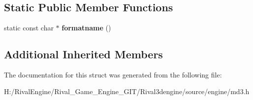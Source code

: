 \subsection*{Static Public Member Functions}
\begin{DoxyCompactItemize}
\item 
\mbox{\label{structmd3_a80b9257f903ddea6448d6ef2470c4413}} 
static const char $\ast$ {\bfseries formatname} ()
\end{DoxyCompactItemize}
\subsection*{Additional Inherited Members}


The documentation for this struct was generated from the following file\+:\begin{DoxyCompactItemize}
\item 
H\+:/\+Rival\+Engine/\+Rival\+\_\+\+Game\+\_\+\+Engine\+\_\+\+G\+I\+T/\+Rival3dengine/source/engine/md3.\+h\end{DoxyCompactItemize}
